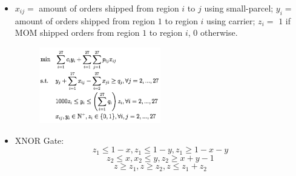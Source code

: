\documentclass[10pt, twocolumn]{article}
\begin{document}
\begin{itemize}
\begin{figure}[!h]
\end{figure}
\item $x_{ij}=$ amount of orders shipped from region $i$ to $j$ using small-parcel; $y_i=$ amount of orders shipped from region $1$ to region $i$ using carrier; $z_i=$ $1$ if MOM shipped orders from region $1$ to region $i$, $0$ otherwise.
\begin{figure}[!h]
\centering
\includegraphics[width=0.5\textwidth]{eg4}
\end{figure}
\item XNOR Gate: 
\[ z_1 \leq 1-x, z_1 \leq 1-y, z_1 \geq 1-x-y \]
\[ z_2 \leq x, x_2 \leq y, z_2 \geq x+y-1  \]
\[ z \geq z_1, z \geq z_2, z \leq z_1+z_2 \]
\end{itemize}
\end{document}
